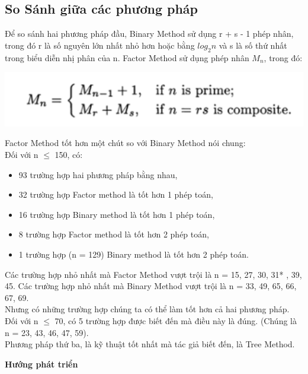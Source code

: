 \documentclass{article}
\begin{document}
\begin{multicols}{3}
\section*{\LARGE So Sánh giữa các phương pháp}
  \qquad Để so sánh hai phương pháp đầu, Binary Method sử dụng r + s - 1 phép nhân, trong đó r là số nguyên lớn nhất nhỏ hơn hoặc 
  bằng $log_2n$ và s là số thứ nhất trong biểu diễn nhị phân của n. Factor Method sử dụng phép nhân $M_n$, trong đó:
  \begin{center}
    \includegraphics[width=.6\linewidth]{compair.png}
  \end{center}
  \qquad Factor Method tốt hơn một chút so với Binary Method nói chung:\\
  Đối với n $\leq$ 150, có:
  \begin{center}
    \begin{itemize}
      \item 93 trường hợp hai phương pháp bằng nhau,
      \item 32 trường hợp Factor method là tốt hơn 1 phép toán,
      \item 16 trường hợp Binary method là tốt hơn 1 phép toán,
      \item 8 trường hợp Factor method là tốt hơn 2 phép toán,
      \item 1 trường hợp (n = 129) Binary method là tốt hơn 2 phép toán.
    \end{itemize}
  \end{center}
  \indent \qquad Các trường hợp nhỏ nhất mà Factor Method vượt trội là n = 15, 27, 30, 31* , 39, 45. Các trường hợp nhỏ nhất mà Binary 
  Method vượt trội là n = 33, 49, 65, 66, 67, 69.\\
  \indent \qquad Nhưng có những trường hợp chúng ta có thể làm tốt hơn cả hai phương pháp. Đối với n $\leq$ 70, có 5 trường hợp được biết 
  đến mà điều này là đúng. (Chúng là n = 23, 43, 46, 47, 59).\\
  \indent \qquad Phương pháp thứ ba, là kỹ thuật tốt nhất mà tác giả biết đến, là Tree Method.
\noindent



\colorbox{marronrp3}{
  \begin{minipage}[t]{.96\linewidth}
    \vspace{.2cm}
    \centerline{\huge \textbf{Hướng phát triển}}
    \vspace{.05cm}


\end{minipage}}
\end{multicols}
\end{document}
